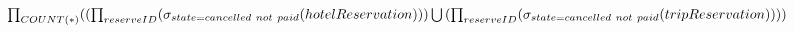 \setLTR
$
\prod_{COUNT(*)}( \\
	(\prod_{reserveID}(\sigma_{state=cancelled \ not \ paid }(hotelReservation))) 
	\\ \bigcup \\
	(\prod_{reserveID}(\sigma_{state=cancelled \ not \ paid }(tripReservation))) 
	)
\\$
\setRTL